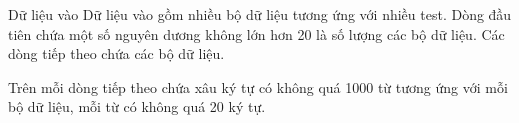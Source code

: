 Dữ liệu vào
Dữ liệu vào gồm nhiều bộ dữ liệu tương ứng với nhiều test. Dòng đầu tiên chứa một số nguyên dương không lớn hơn 20 là số lượng các bộ dữ liệu. Các dòng tiếp theo chứa các bộ dữ liệu.  

   Trên mỗi dòng tiếp theo chứa xâu ký tự có không quá 1000 từ tương ứng với mỗi bộ dữ liệu, mỗi từ có không quá 20 ký tự.